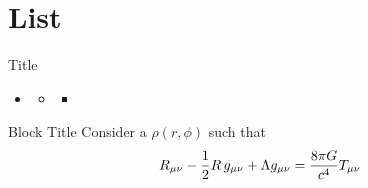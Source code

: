 \documentclass[10pt, aspectratio=169]{beamer}
\begin{document}
\section{List}
{
    \begin{frame}
        \sectionpage%
    \end{frame}
}

\begin{frame}{Title}
    \begin{itemize}
    \item \lipsum[1][5]
        \begin{itemize}
        \item \lipsum[1][5]
            \begin{itemize}
            \item \lipsum[1][5]
            \end{itemize}
        \end{itemize}
    \end{itemize}

    \begin{block}{Block Title}
        Consider a  $\rho(r,\phi)$ such that
        \begin{equation*}
            R_{\mu \nu} - {1 \over 2}R \, g_{\mu \nu} + \Lambda g_{\mu \nu}= {8 \pi G \over c^4} T_{\mu \nu}
        \end{equation*}
    \end{block}
\end{frame}

\end{document}
